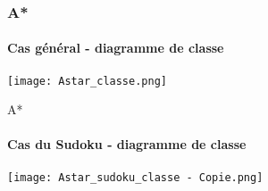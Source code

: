
\begin{frame}
    \frametitle{A*}
	\framesubtitle{Cas général - diagramme de classe}

\begin{center}

\texttt{[image: Astar\_classe.png]}

\end{center}

\end{frame}


\begin{frame}{A*}

\framesubtitle{Cas du Sudoku - diagramme de classe}

\begin{center}

\texttt{[image: Astar\_sudoku\_classe - Copie.png]}

\end{center}

\end{frame}